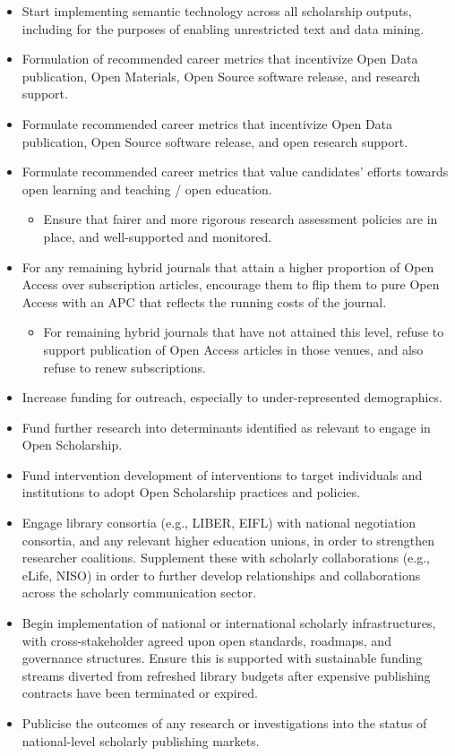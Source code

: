 \documentclass[]{article}
\providecommand{\tightlist}{%
  \setlength{\itemsep}{0pt}\setlength{\parskip}{0pt}}
\begin{document}
\begin{itemize}
\item
  Start implementing semantic technology across all scholarship outputs,
  including for the purposes of enabling unrestricted text and data
  mining.
\item
  Formulation of recommended career metrics that incentivize Open Data
  publication, Open Materials, Open Source software release, and
  research support.
\item
  Formulate recommended career metrics that incentivize Open Data
  publication, Open Source software release, and open research support.
\item
  Formulate recommended career metrics that value candidates' efforts
  towards open learning and teaching / open education.

  \begin{itemize}
  \tightlist
  \item
    Ensure that fairer and more rigorous research assessment policies
    are in place, and well-supported and monitored.
  \end{itemize}
\item
  For any remaining hybrid journals that attain a higher proportion of
  Open Access over subscription articles, encourage them to flip them to
  pure Open Access with an APC that reflects the running costs of the
  journal.

  \begin{itemize}
  \tightlist
  \item
    For remaining hybrid journals that have not attained this level,
    refuse to support publication of Open Access articles in those
    venues, and also refuse to renew subscriptions.
  \end{itemize}
\item
  Increase funding for outreach, especially to under-represented
  demographics.
\item
  Fund further research into determinants identified as relevant to
  engage in Open Scholarship.
\item
  Fund intervention development of interventions to target individuals
  and institutions to adopt Open Scholarship practices and policies.
\item
  Engage library consortia (e.g., LIBER, EIFL) with national negotiation
  consortia, and any relevant higher education unions, in order to
  strengthen researcher coalitions. Supplement these with scholarly
  collaborations (e.g., eLife, NISO) in order to further develop
  relationships and collaborations across the scholarly communication
  sector.
\item
  Begin implementation of national or international scholarly
  infrastructures, with cross-stakeholder agreed upon open standards,
  roadmaps, and governance structures. Ensure this is supported with
  sustainable funding streams diverted from refreshed library budgets
  after expensive publishing contracts have been terminated or expired.
\item
  Publicise the outcomes of any research or investigations into the
  status of national-level scholarly publishing markets.
\end{itemize}
\end{document}
